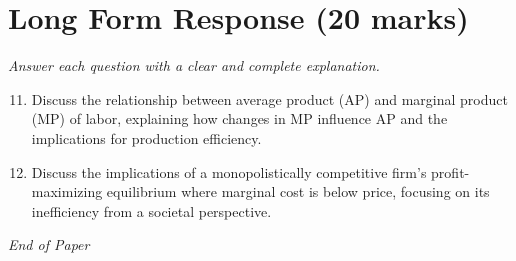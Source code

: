 \documentclass[12pt]{article}
\begin{document}
\section*{Long Form Response (20 marks)}
\textit{Answer each question with a clear and complete explanation.}
\begin{enumerate}[label=\arabic*.]
\setcounter{enumi}{10}
\item Discuss the relationship between average product (AP) and marginal product (MP) of labor, explaining how changes in MP influence AP and the implications for production efficiency.
\item Discuss the implications of a monopolistically competitive firm's profit-maximizing equilibrium where marginal cost is below price, focusing on its inefficiency from a societal perspective.
\end{enumerate}

\vfill
\noindent\textit{End of Paper}
\end{document}
